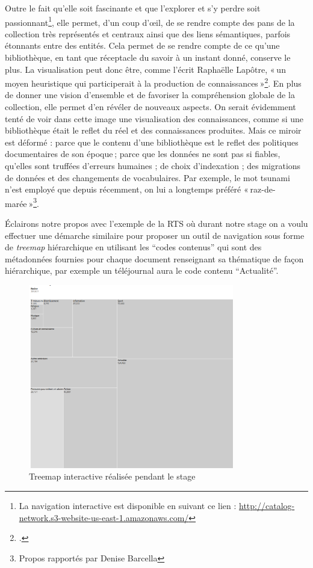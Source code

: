 Outre le fait qu’elle soit fascinante et que l’explorer et s’y perdre soit passionnant\footnote{La navigation interactive est disponible en suivant ce lien : \url{ http://catalog-network.s3-website-us-east-1.amazonaws.com/}}, elle permet, d’un coup d’œil, de se rendre compte des pans de la collection très représentés et centraux ainsi que des liens sémantiques, parfois étonnants entre des entités. Cela permet de se rendre compte de ce qu’une bibliothèque, en tant que réceptacle du savoir à un instant donné, conserve le plus. La visualisation peut donc être, comme l’écrit Raphaëlle Lapôtre, « un moyen heuristique qui participerait à la production de connaissances »\footcite[§ 23]{lapotre_visualiser_2016}. En plus de donner une vision d’ensemble et de favoriser la compréhension globale de la collection, elle permet d'en révéler de nouveaux aspects. On serait évidemment tenté de voir dans cette image une visualisation des connaissances, comme si une bibliothèque était le reflet du réel et des connaissances produites. Mais ce miroir est déformé : parce que le contenu d’une bibliothèque est le reflet des politiques documentaires de son époque ; parce que les données ne sont pas si fiables, qu’elles sont truffées d’erreurs humaines ; de choix d’indexation ; des migrations de données et des changements de vocabulaires. Par exemple, le mot tsunami n’est employé que depuis récemment, on lui a longtemps préféré « raz-de-marée »\footnote{Propos rapportés par Denise Barcella}.

Éclairons notre propos avec l’exemple de la RTS où durant notre stage on a voulu effectuer une démarche similaire pour proposer un outil de navigation sous forme de \textit{treemap} hiérarchique en utilisant les \enquote{codes contenus} qui sont des métadonnées fournies pour chaque document renseignant sa thématique de façon hiérarchique, par exemple un téléjournal aura le code contenu \enquote{Actualité}.



\begin{figure}[h!]
	\centering
	\includegraphics[width=0.8\textwidth]{images/image13.png}
	\caption{Treemap interactive réalisée pendant le stage}
	\label{fig:image13}
\end{figure}



